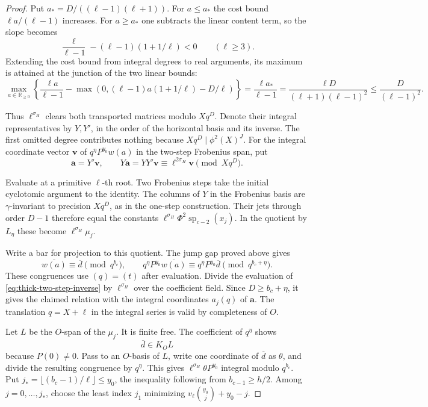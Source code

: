 \begin{proof}
Put \(a_*=D/((\ell-1)(\ell+1))\). For \(a\le a_*\) the cost bound
\(\ell a/(\ell-1)\) increases. For \(a\ge a_*\) one subtracts the
linear content term, so the slope becomes
\[
 \frac{\ell}{\ell-1}-(\ell-1)(1+1/\ell)<0\qquad(\ell\ge3).
\]
Extending the cost bound from integral degrees to real arguments, its maximum is attained at the junction of the two linear bounds:
\[
 \max_{a\in\mathbb R_{\ge0}}\left\{\frac{\ell a}{\ell-1}
       -\max\left(0,(\ell-1)a(1+1/\ell)-D/\ell\right)\right\}
 =\frac{\ell a_*}{\ell-1}
 =\frac{\ell D}{(\ell+1)(\ell-1)^2}
 \le \frac{D}{(\ell-1)^2}.
\]

Thus \(\ell^{\sigma_H}\) clears both transported matrices
modulo \(Xq^D\). Denote their integral representatives by \(Y,Y'\),
in the order of the horizontal basis and its inverse. The first
omitted degree contributes nothing because \(Xq^D\mid\phi^2(X)^J\).
For the integral coordinate vector \(\mathbf v\) of
\(q^\eta P^{y_0}w(a)\) in the two-step Frobenius span, put
\begin{equation}\label{eq:thick-two-step-inverse}
 \mathbf a=Y'\mathbf v,\qquad
 Y\mathbf a=YY'\mathbf v\equiv\ell^{2\sigma_H}\mathbf v
                                              \pmod{Xq^D}.
\end{equation}

Evaluate at a primitive \(\ell\)-th root. Two Frobenius steps take
the initial cyclotomic argument to the identity. The columns of
\(Y\) in the Frobenius basis are \(\gamma\)-invariant to precision
\(Xq^D\), as in the one-step construction. Their jets through
order \(D-1\) therefore equal the constants
\(\ell^{\sigma_H}\Phi^2\operatorname{sp}_{c-2}(x_j)\).
In the quotient by \(L_\eta\) these become
\(\ell^{\sigma_H}\mu_j\).

Write a bar for projection to this quotient.
The jump gap proved above gives
\[
 \overline{w(a)}\equiv\overline d\pmod{q^{b_c}},\qquad
 q^\eta P^{y_0}\overline{w(a)}
    \equiv q^\eta P^{y_0}\overline d\pmod{q^{b_c+\eta}} .
\]
These congruences use \((q)=(t)\) after evaluation.
Divide the evaluation of \eqref{eq:thick-two-step-inverse} by \(\ell^{\sigma_H}\) over
the coefficient field. Since \(D\ge b_c+\eta\), it gives the claimed
relation with the integral coordinates \(a_j(q)\) of \(\mathbf a\).
The translation \(q=X+\ell\) in the integral series is valid by
completeness of \(O\).

Let \(L\) be the \(O\)-span of the \(\mu_j\). It is finite free.
The coefficient of \(q^\eta\) shows
\[
 \overline d\in K_O L
\]
because \(P(0)\ne0\). Pass to an \(O\)-basis of \(L\), write
one coordinate of \(\overline d\) as \(\theta\), and divide the
resulting congruence by \(q^\eta\). This gives
\(\ell^{\sigma_H}\theta P^{y_0}\) integral modulo \(q^{b_c}\).
Put \(j_*=\lfloor(b_c-1)/\ell\rfloor\le y_0\), the inequality
following from \(b_{c-1}\ge h/2\). Among
\(j=0,\ldots,j_*\), choose the least index \(j_1\) minimizing
\(v_\ell\binom{y_0}{j}+y_0-j\).


\end{proof}
